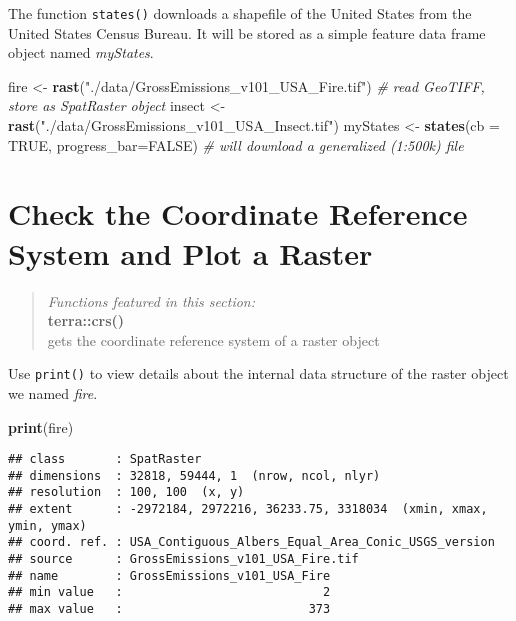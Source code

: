 \documentclass[
]{article}
\newenvironment{Shaded}{\begin{snugshade}}{\end{snugshade}}
\newcommand{\AttributeTok}[1]{\textcolor[rgb]{0.13,0.29,0.53}{#1}}
\newcommand{\CommentTok}[1]{\textcolor[rgb]{0.56,0.35,0.01}{\textit{#1}}}
\newcommand{\ConstantTok}[1]{\textcolor[rgb]{0.56,0.35,0.01}{#1}}
\newcommand{\FunctionTok}[1]{\textcolor[rgb]{0.13,0.29,0.53}{\textbf{#1}}}
\newcommand{\NormalTok}[1]{#1}
\newcommand{\OtherTok}[1]{\textcolor[rgb]{0.56,0.35,0.01}{#1}}
\newcommand{\StringTok}[1]{\textcolor[rgb]{0.31,0.60,0.02}{#1}}
\begin{document}
The function \texttt{states()} downloads a shapefile of the United
States from the United States Census Bureau. It will be stored as a
simple feature data frame object named \emph{myStates}.

\begin{Shaded}
\begin{Highlighting}[]
\NormalTok{fire }\OtherTok{\textless{}{-}} \FunctionTok{rast}\NormalTok{(}\StringTok{"./data/GrossEmissions\_v101\_USA\_Fire.tif"}\NormalTok{)  }\CommentTok{\# read GeoTIFF, store as SpatRaster object}
\NormalTok{insect }\OtherTok{\textless{}{-}} \FunctionTok{rast}\NormalTok{(}\StringTok{"./data/GrossEmissions\_v101\_USA\_Insect.tif"}\NormalTok{) }
\NormalTok{myStates }\OtherTok{\textless{}{-}} \FunctionTok{states}\NormalTok{(}\AttributeTok{cb =} \ConstantTok{TRUE}\NormalTok{, }\AttributeTok{progress\_bar=}\ConstantTok{FALSE}\NormalTok{)  }\CommentTok{\# will download a generalized (1:500k) file }
\end{Highlighting}
\end{Shaded}

\hypertarget{check-the-coordinate-reference-system-and-plot-a-raster}{%
\section{Check the Coordinate Reference System and Plot a
Raster}\label{check-the-coordinate-reference-system-and-plot-a-raster}}

\begin{quote}
\emph{Functions featured in this section:}\\
\textbf{terra::crs()}\\
gets the coordinate reference system of a raster object
\end{quote}

Use \texttt{print()} to view details about the internal data structure
of the raster object we named \emph{fire}.

\begin{Shaded}
\begin{Highlighting}[]
\FunctionTok{print}\NormalTok{(fire) }
\end{Highlighting}
\end{Shaded}

\begin{verbatim}
## class       : SpatRaster 
## dimensions  : 32818, 59444, 1  (nrow, ncol, nlyr)
## resolution  : 100, 100  (x, y)
## extent      : -2972184, 2972216, 36233.75, 3318034  (xmin, xmax, ymin, ymax)
## coord. ref. : USA_Contiguous_Albers_Equal_Area_Conic_USGS_version 
## source      : GrossEmissions_v101_USA_Fire.tif 
## name        : GrossEmissions_v101_USA_Fire 
## min value   :                            2 
## max value   :                          373
\end{verbatim}
\end{document}
